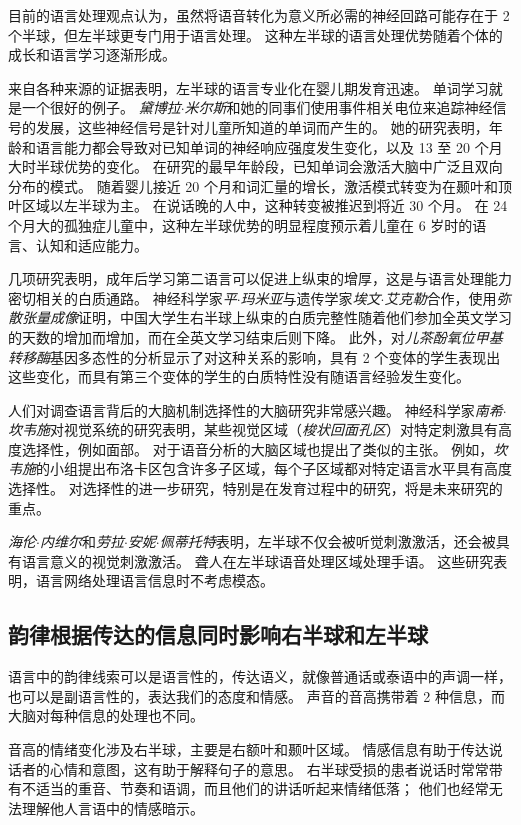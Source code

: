 目前的语言处理观点认为，虽然将语音转化为意义所必需的神经回路可能存在于 2 个半球，但左半球更专门用于语言处理。
这种左半球的语言处理优势随着个体的成长和语言学习逐渐形成。


来自各种来源的证据表明，左半球的语言专业化在婴儿期发育迅速。
单词学习就是一个很好的例子。
\textit{黛博拉$\cdot$米尔斯}和她的同事们使用事件相关电位来追踪神经信号的发展，这些神经信号是针对儿童所知道的单词而产生的。
她的研究表明，年龄和语言能力都会导致对已知单词的神经响应强度发生变化，以及 13 至 20 个月大时半球优势的变化。
在研究的最早年龄段，已知单词会激活大脑中广泛且双向分布的模式。
随着婴儿接近 20 个月和词汇量的增长，激活模式转变为在颞叶和顶叶区域以左半球为主。
在说话晚的人中，这种转变被推迟到将近 30 个月。
在 24 个月大的孤独症儿童中，这种左半球优势的明显程度预示着儿童在 6 岁时的语言、认知和适应能力。


几项研究表明，成年后学习第二语言可以促进上纵束的增厚，这是与语言处理能力密切相关的白质通路。
神经科学家\textit{平$\cdot$玛米亚}与遗传学家\textit{埃文$\cdot$艾克勒}合作，使用\textit{弥散张量成像}证明，中国大学生右半球上纵束的白质完整性随着他们参加全英文学习的天数的增加而增加，而在全英文学习结束后则下降。
此外，对\textit{儿茶酚氧位甲基转移酶}基因多态性的分析显示了对这种关系的影响，具有 2 个变体的学生表现出这些变化，而具有第三个变体的学生的白质特性没有随语言经验发生变化。


人们对调查语言背后的大脑机制选择性的大脑研究非常感兴趣。
神经科学家\textit{南希$\cdot$坎韦施}对视觉系统的研究表明，某些视觉区域（\textit{梭状回面孔区}）对特定刺激具有高度选择性，例如面部。
对于语音分析的大脑区域也提出了类似的主张。
例如，\textit{坎韦施}的小组提出布洛卡区包含许多子区域，每个子区域都对特定语言水平具有高度选择性。
对选择性的进一步研究，特别是在发育过程中的研究，将是未来研究的重点。


\textit{海伦$\cdot$内维尔}和\textit{劳拉$\cdot$安妮$\cdot$佩蒂托特}表明，左半球不仅会被听觉刺激激活，还会被具有语言意义的视觉刺激激活。
聋人在左半球语音处理区域处理手语。
这些研究表明，语言网络处理语言信息时不考虑模态。



\subsection{韵律根据传达的信息同时影响右半球和左半球}

语言中的韵律线索可以是语言性的，传达语义，就像普通话或泰语中的声调一样，也可以是副语言性的，表达我们的态度和情感。
声音的音高携带着 2 种信息，而大脑对每种信息的处理也不同。


音高的情绪变化涉及右半球，主要是右额叶和颞叶区域。
情感信息有助于传达说话者的心情和意图，这有助于解释句子的意思。
右半球受损的患者说话时常常带有不适当的重音、节奏和语调，而且他们的讲话听起来情绪低落；
他们也经常无法理解他人言语中的情感暗示。


